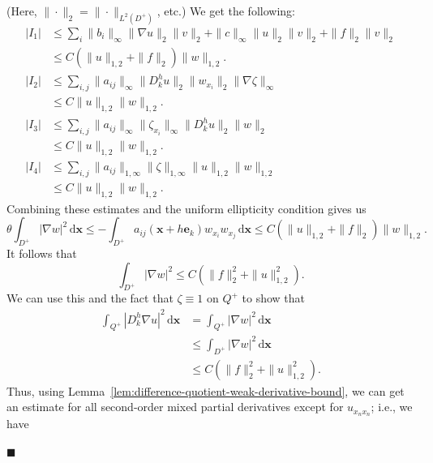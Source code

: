 \begingroup
\renewcommand{\endProof}{\par\nobreak\hfill$\blacksquare$\par\vspace{0.1cm}}
\begingroup
\renewenvironment{Proof}{\par}{\par\nobreak\hfill$\blacksquare$\par\vspace{0.1cm}}
\begin{Proof}
(Here, $\|\cdot\|_2=\|\cdot\|_{L^2(D^+)}$, etc.) We get the following:\[\begin{aligned}
|I_1|&\leq\sum_i\|b_i\|_\infty\|\nabla u\|_2\|v\|_2+\|c\|_\infty\|u\|_2\|v\|_2+\|f\|_2\|v\|_2\\
&\leq C(\|u\|_{1,2}+\|f\|_2)\|w\|_{1,2}.\\[1ex]
|I_2|&\leq\sum_{i,j}\|a_{ij}\|_\infty\|D_k^hu\|_2\|w_{x_i}\|_2\|\nabla\zeta\|_\infty\\
&\leq C\|u\|_{1,2}\|w\|_{1,2}.\\[1ex]
|I_3|&\leq\sum_{i,j}\|a_{ij}\|_\infty\|\zeta_{x_i}\|_\infty\|D_k^hu\|_2\|w\|_2\\
&\leq C\|u\|_{1,2}\|w\|_{1,2}.\\[1ex]
|I_4|&\leq\sum_{i,j}\|a_{ij}\|_{1,\infty}\|\zeta\|_{1,\infty}\|u\|_{1,2}\|w\|_{1,2}\\
&\leq C\|u\|_{1,2}\|w\|_{1,2}.
\end{aligned}\]Combining these estimates and the uniform ellipticity condition gives us
\begin{equation}\label{eq:flat-boundary-coercive-localized-gradient-estimate}
\theta\int_{D^+}|\nabla w|^2\,\mathrm{d}\bm{x}\leq-\int_{D^+}a_{ij}(\bm{x}+h\bm{e}_k)w_{x_i}w_{x_j}\,\mathrm{d}\bm{x}\leq C(\|u\|_{1,2}+\|f\|_2)\|w\|_{1,2}.
\end{equation}
It follows that
\begin{equation}\label{eq:flat-boundary-localized-gradient-l2-bound}
\int_{D^+}|\nabla w|^2\leq C(\|f\|_2^2+\|u\|_{1,2}^2).
\end{equation}
We can use this and the fact that $\zeta\equiv1$ on $Q^+$ to show that\[\begin{aligned}
\int_{Q^+}|D_k^h\nabla u|^2\,\mathrm{d}\bm{x}&=\int_{Q^+}|\nabla w|^2\,\mathrm{d}\bm{x}\\
&\leq\int_{D^+}|\nabla w|^2\,\mathrm{d}\bm{x}\\
&\leq C(\|f\|_2^2+\|u\|_{1,2}^2).
\end{aligned}\]Thus, using Lemma~\ref{lem:difference-quotient-weak-derivative-bound}, we can get an estimate for all second-order mixed partial derivatives except for $u_{x_nx_n}$; i.e., we have

\end{Proof}
